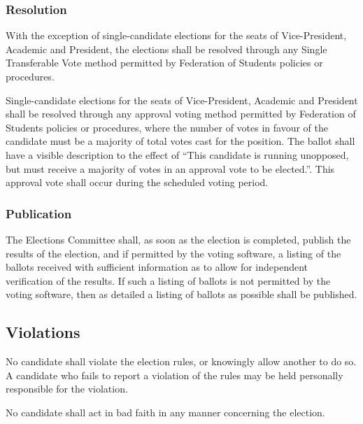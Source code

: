 \subsubsection{Resolution}
With the exception of single-candidate elections for the seats of Vice-President, Academic and President, the elections shall be resolved through any Single Transferable Vote method permitted by Federation of Students policies or procedures.

Single-candidate elections for the seats of Vice-President, Academic and President shall be resolved through any approval voting method permitted by Federation of Students policies or procedures, where the number of votes in favour of the candidate must be a majority of total votes cast for the position. The ballot shall have a visible description to the effect of ``This candidate is running unopposed, but must receive a majority of votes in an approval vote to be elected.''. This approval vote shall occur during the scheduled voting period.

\subsubsection{Publication}
\label{elections:voting:publication}
The Elections Committee shall, as soon as the election is completed, publish the results of the election, and if permitted by the voting software, a listing of the ballots received with sufficient information as to allow for independent verification of the results.
If such a listing of ballots is not permitted by the voting software, then as detailed a listing of ballots as possible shall be published.

\subsection{Violations}

No candidate shall violate the election rules, or knowingly allow another to do so.
A candidate who fails to report a violation of the rules may be held personally responsible for the violation.

No candidate shall act in bad faith in any manner concerning the election.

